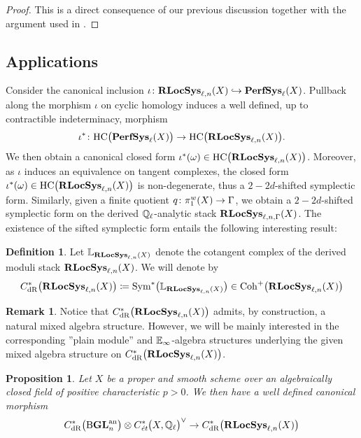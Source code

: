\documentclass[10pt,a4paper]{amsart}
\numberwithin{equation}{subsection}
\theoremstyle{plain}
\newtheorem{prop}[theorem]{Proposition}
\theoremstyle{definition}
\newtheorem{defi}[theorem]{Definition}
\newtheorem{rema}[theorem]{Remark}
\theoremstyle{remark}
\numberwithin{equation}{section}
\begin{document}
\begin{proof}
This is a direct consequence of our previous discussion together with the argument used in \cite[Theorem 3.7]{toen_ss}.
\end{proof}


\subsection{Applications} Consider the canonical inclusion $\iota \colon \mathbf R \mathbf{LocSys}_{\ell, n}(X) \hookrightarrow \mathbf{PerfSys}_{\ell}(X)$. Pullback along the morphism $\iota$ on cyclic homology induces a well defined, up to contractible indeterminacy, morphism
	\[
		\iota^* \colon \mathrm H \mathrm C \big( \mathbf{PerfSys}_{\ell}(X) \big) \to \mathrm H \mathrm C \big( \mathbf R \mathbf{LocSys}_{\ell, n}(X) \big).
	\]
We then obtain a canonical closed form $\iota^* (\omega ) \in \mathrm H \mathrm C \big( \mathbf R \mathbf{LocSys}_{\ell, n}(X) \big)$. Moreover, as $\iota$ induces an equivalence on tangent complexes, the closed form $\iota^* (\omega ) \in \mathrm H \mathrm C \big( \mathbf R \mathbf{LocSys}_{\ell, n}(X) \big)$ is non-degenerate,
thus a $2-2d$-shifted symplectic form. Similarly, given a finite quotient $q \colon \pi_1^w(X) \to \Gamma$, we obtain a $2-2d$-shifted symplectic form on the derived $\mathbb Q_\ell$-analytic stack $\mathbf R \mathbf{LocSys}_{\ell, n, \Gamma}(X)$. The existence of the sifted symplectic form entails
the following interesting result:

\begin{defi}
Let $\mathbb L_{\mathbf R \mathbf{LocSys}_{\ell, n}(X)}$ denote the cotangent complex of the derived moduli stack $\mathbf R \mathbf{LocSys}_{\ell, n}(X)$. We will denote by 
	\[
		C^*_{\mathrm{dR}} \big( \mathbf R \mathbf{LocSys}_{\ell, n}(X) \big) \coloneqq \mathrm{Sym}^* \big( \mathbb L_{\mathbf R \mathbf{LocSys}_{\ell, n}(X)} \big) \in \mathrm{Coh}^+ \big( \mathbf R \mathbf{LocSys}_{\ell, n}(X) \big)
	\]
\end{defi}

\begin{rema}
Notice that $C^*_{\mathrm{dR}} \big( \mathbf R \mathbf{LocSys}_{\ell, n}(X) \big)$ admits, by construction, a natural mixed algebra structure. However, we will be mainly interested in the corresponding ''plain module'' and $\mathbb E_\infty$-algebra structures
underlying the given mixed algebra structure on $C^*_{\mathrm{dR}} \big( \mathbf R \mathbf{LocSys}_{\ell, n}(X) \big)$.
\end{rema}

\begin{prop}
Let $X$ be a proper and smooth scheme over an algebraically closed field of positive characteristic $p> 0$. We then have a well defined canonical morphism
	\[
		C^*_{\mathrm{dR}} \big( \mathrm{B} \mathbf{GL}_n^{\mathrm{an}} \big) \otimes C^*_{\emph{\text{\'et}}} \big(X, \mathbb Q_\ell \big)^\vee \to  C^*_{\mathrm{dR}} \big( \mathbf R \mathbf{LocSys}_{\ell, n}(X) \big)
	\]
\end{prop}
\end{document}
